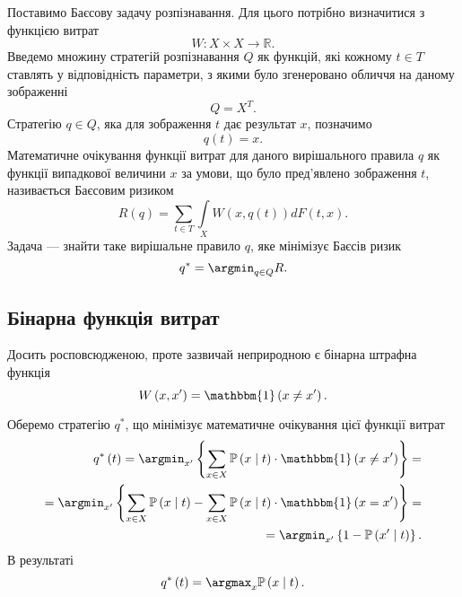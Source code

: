 Поставимо Баєсову задачу розпізнавання.
Для цього потрібно визначитися з функцією витрат
\cite{berger1980}
\begin{equation*}
  W: X \times X \rightarrow \mathbb{R}.
\end{equation*}
Введемо множину стратегій розпізнавання $Q$ як функцій,
які кожному $t \in T$ ставлять у відповідність параметри,
з якими було згенеровано обличчя на даному зображенні
\begin{equation*}
  Q = X^T.
\end{equation*}
Стратегію $q \in Q$, яка для зображення $t$ дає результат $x$, позначимо
\begin{equation*}
  q\left( t \right) = x.
\end{equation*}
Математичне очікування функції витрат для даного вирішального правила $q$
як функції випадкової величини $x$ за умови,
що було пред'явлено зображення $t$, називається Баєсовим ризиком
\cite{schlesinger:2002}
\begin{equation*}
  R \left( q \right)
  = \sum\limits_{t \in T} \int\limits_{X}
    W \left( x, q\left( t \right) \right)
    d F\left( t, x \right).
\end{equation*}
Задача --- знайти таке вирішальне правило $q$, яке мінімізує Баєсів ризик
\cite{wald1955selected}
\begin{equation*}
  q^* = \argmin_{q \in Q} R.
\end{equation*}

\subsection{Бінарна функція витрат}

Досить росповсюдженою, проте зазвичай неприродною є бінарна штрафна функція
\begin{equation*}
  W \left( x, x' \right)
  = \mathbbm{1} \left( x \neq x' \right).
\end{equation*}

Оберемо стратегію $q^*$,
що мінімізує математичне очікування цієї функції витрат
\begin{equation*}
  \begin{split}
    q^* \left( t \right)
    = \argmin_{x'} \left\{
      \sum\limits_{x \in X}
        \mathbb{P}\left( x \;\middle|\;  t \right)
        \cdot \mathbbm{1} \left( x \neq x' \right)
      \right\} = \\
    = \argmin_{x'} \left\{
      \sum\limits_{x \in X}
        \mathbb{P}\left( x \;\middle|\;  t \right)
      - \sum\limits_{x \in X}
        \mathbb{P}\left( x \;\middle|\;  t \right)
        \cdot \mathbbm{1} \left( x = x' \right)
      \right\} = \\
    = \argmin_{x'} \left\{
      1 - \mathbb{P}\left( x' \;\middle|\;  t \right)
      \right\}.
  \end{split}
\end{equation*}
В результаті
\begin{equation*}
  q^* \left( t \right)
  = \argmax_x \mathbb{P} \left( x \;\middle|\;  t \right).
\end{equation*}

